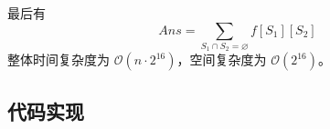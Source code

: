 最后有 \[
Ans=\sum_{S_1\cap S_2 = \varnothing}f[S_1][S_2]
\] 整体时间复杂度为 \(\mathcal{O}(n\cdot 2^{16})\)，空间复杂度为
\(\mathcal{O}(2^{16})\)。

\subsection{代码实现}

\inputminted[frame=lines, numbers=left, fontsize=\scriptsize, tabsize=4, breaklines=true]{c++}{code/2.cpp}











